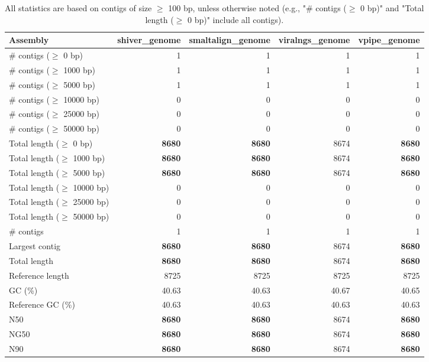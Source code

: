 \documentclass[12pt,a4paper]{article}
\begin{document}
\begin{table}[ht]
\begin{center}
\caption{All statistics are based on contigs of size $\geq$ 100 bp, unless otherwise noted (e.g., "\# contigs ($\geq$ 0 bp)" and "Total length ($\geq$ 0 bp)" include all contigs).}
\begin{tabular}{|l*{4}{|r}|}
\hline
Assembly & shiver\_genome & smaltalign\_genome & viralngs\_genome & vpipe\_genome \\ \hline
\# contigs ($\geq$ 0 bp) & 1 & 1 & 1 & 1 \\ \hline
\# contigs ($\geq$ 1000 bp) & 1 & 1 & 1 & 1 \\ \hline
\# contigs ($\geq$ 5000 bp) & 1 & 1 & 1 & 1 \\ \hline
\# contigs ($\geq$ 10000 bp) & 0 & 0 & 0 & 0 \\ \hline
\# contigs ($\geq$ 25000 bp) & 0 & 0 & 0 & 0 \\ \hline
\# contigs ($\geq$ 50000 bp) & 0 & 0 & 0 & 0 \\ \hline
Total length ($\geq$ 0 bp) & {\bf 8680} & {\bf 8680} & 8674 & {\bf 8680} \\ \hline
Total length ($\geq$ 1000 bp) & {\bf 8680} & {\bf 8680} & 8674 & {\bf 8680} \\ \hline
Total length ($\geq$ 5000 bp) & {\bf 8680} & {\bf 8680} & 8674 & {\bf 8680} \\ \hline
Total length ($\geq$ 10000 bp) & 0 & 0 & 0 & 0 \\ \hline
Total length ($\geq$ 25000 bp) & 0 & 0 & 0 & 0 \\ \hline
Total length ($\geq$ 50000 bp) & 0 & 0 & 0 & 0 \\ \hline
\# contigs & 1 & 1 & 1 & 1 \\ \hline
Largest contig & {\bf 8680} & {\bf 8680} & 8674 & {\bf 8680} \\ \hline
Total length & {\bf 8680} & {\bf 8680} & 8674 & {\bf 8680} \\ \hline
Reference length & 8725 & 8725 & 8725 & 8725 \\ \hline
GC (\%) & 40.63 & 40.63 & 40.67 & 40.65 \\ \hline
Reference GC (\%) & 40.63 & 40.63 & 40.63 & 40.63 \\ \hline
N50 & {\bf 8680} & {\bf 8680} & 8674 & {\bf 8680} \\ \hline
NG50 & {\bf 8680} & {\bf 8680} & 8674 & {\bf 8680} \\ \hline
N90 & {\bf 8680} & {\bf 8680} & 8674 & {\bf 8680} \\ \hline

\end{tabular}
\end{center}
\end{table}
\end{document}
